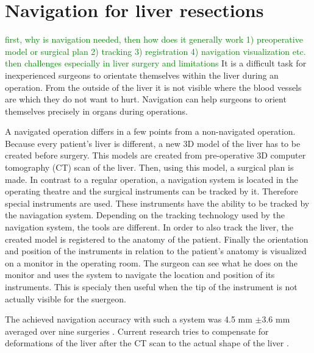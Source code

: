\section{Navigation for liver resections}
\label{sec:navigationForLiverResections}
\textcolor{green}{first, why is navigation needed, then how does it generally work
  1) preoperative model or surgical plan 2) tracking 3) registration 4)
  navigation visualization etc. then challenges especially in liver surgery and limitations}
It is a difficult task for inexperienced surgeons to orientate themselves within the liver during an operation.
From the outside of the liver it is not visible where the blood vessels are which they do not want to hurt.
Navigation can help surgeons to orient themselves precisely in organs during
operations.

A navigated operation differs in a few points from a non-navigated operation.
Because every patient's liver is different, a new 3D model of the liver has to
be created before surgery. This models are created from pre-operative 3D
computer tomography (CT) scan of the liver. Then, using this model, a surgical plan is made.
In contrast to a regular operation, a navigation system is located in the
operating theatre and the surgical instruments can be tracked by it. Therefore special instruments are used. These
instruments have the ability to be tracked by the naviagation system. Depending
on the tracking technology used by the navigation system, the tools are different.
In order to also track the liver, the created model is registered to the anatomy
of the patient. Finally the orientation and position
of the instruments in relation to the patient's anatomy is visualized on a
monitor in the operating room. The surgeon can see what he does on the
monitor and uses the system to navigate the location and position of its
instruments. This is specialy then useful when the tip of the instrument is not
actually visible for the suergeon.

The achieved
navigation accuracy with such a system was 4.5 mm $\pm$3.6 mm averaged over nine surgeries \cite{peterhans2011navigation}.
Current research tries to compensate for deformations of the liver after the CT
scan to the actual shape of the liver \cite{clements2017deformation}
\cite{clements2015validation}. 

